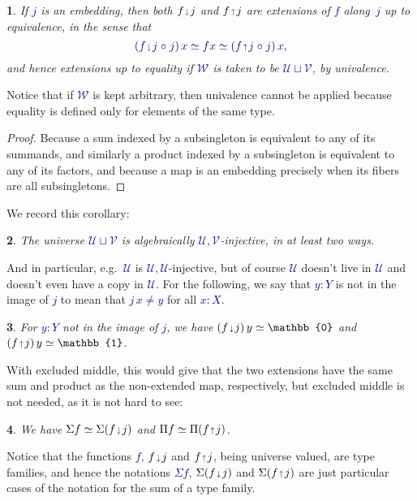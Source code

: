 \documentclass[10pt]{article}
\newcommand{\db}{\textcolor{darkblue}}
\newcommand{\m}[1]{\db{$#1$}}
\newcommand{\M}[1]{\[\db{#1}\]}
\newcommand{\comp}{\mathrel{\circ}}
\newcommand{\U}{\mathcal{U}}
\newcommand{\V}{\mathcal{V}}
\newcommand{\W}{\mathcal{W}}
\newcommand{\Zero}{\mathbb{0}}
\newcommand{\One}{\mathbb{1}}
\newcommand{\edown}{\scaleobj{0.7}{\,\downarrow\,}}
\newcommand{\eup}{\scaleobj{0.7}{\,\uparrow\,}}
\newtheorem{numbered}{}
\theoremstyle{definition}
\begin{document}
\begin{numbered}
    If \m{j} is an embedding, then both \m{f \edown j} and \m{f \eup j} are extensions of \m{f} along~\m{j} up to equivalence, in the sense that \M{(f \edown j \comp j) \, x \simeq f x \simeq (f \eup j \comp j) \, x,}
and hence extensions up to equality if \m{\W} is taken to be \m{\U \sqcup \V}, by univalence.
\end{numbered}
\noindent Notice that if \m{\W} is kept arbitrary, then univalence cannot be applied because equality is defined only for elements of the same type.
\begin{proof}
Because a sum indexed by a subsingleton is equivalent to any of its
summands, and similarly a product indexed by a subsingleton is equivalent to
any of its factors, and because a map is an embedding precisely when
its fibers are all subsingletons.
\end{proof}
\noindent We record this corollary:
\begin{numbered}
  The universe \m{\U \sqcup \V} is algebraically \m{\U,\V}-injective, in at least two ways.
\end{numbered}
\noindent And in particular, e.g.\ \m{\U} is \m{\U,\U}-injective, but of course
\m{\U} doesn't live in \m{\U} and doesn't even have a copy in
\m{\U}. For the following, we say that \m{y : Y} is not in the image
of \m{j} to mean that \m{j \, x \ne y} for all \m{x:X}.
\begin{numbered}
        For \m{y:Y} not in the image of \m{j}, we have
        \m{(f \edown j) \, y \simeq \Zero} and
        \m{(f \eup j) \, y \simeq \One}.
  \end{numbered}
\noindent With excluded middle, this would give that the two extensions have
the same sum and product as the non-extended map, respectively, but
excluded middle is not needed, as it is not hard to see:
\begin{numbered} We have
\m{\Sigma f \simeq \Sigma (f \edown j)} and
\m{\Pi f \simeq \Pi (f \eup j)}.
\end{numbered}
Notice that the functions \m{f}, \m{f \edown j} and \m{f \eup j},
being universe valued, are type families, and hence the notations
\m{\Sigma f}, \m{\Sigma(f \edown j)} and \m{\Sigma(f \eup j)} are just
particular cases of the notation for the sum of a type family.
\end{document}

